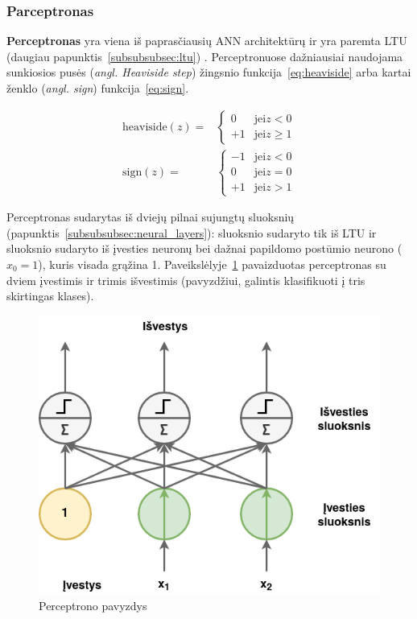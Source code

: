\documentclass{VUMIFPSbakalaurinis}
\begin{document}
\subsubsection{Parceptronas}
{
	\textbf{Perceptronas} yra viena iš paprasčiausių ANN architektūrų ir yra paremta LTU (daugiau papunktis~\ref{subsubsubsec:ltu}) \cite{rosenblatt1957perceptron}. Perceptronuose dažniausiai naudojama sunkiosios pusės (\textit{angl. Heaviside step}) žingsnio funkcija~\ref{eq:heaviside} arba kartai ženklo (\textit{angl. sign}) funkcija~\ref{eq:sign}.
	
	\begin{align}
		\label{eq:heaviside}
		\textrm{heaviside} (z) = &
		\begin{cases} 
			0 & \textrm{jei} z < 0 \\ 
			+1 & \textrm{jei} z \geq 1 
		\end{cases} \\
		\label{eq:sign}
		\textrm{sign} (z) = &
		\begin{cases} 
			-1 & \textrm{jei} z < 0 \\ 
			0 & \textrm{jei} z = 0 \\ 
			+1 & \textrm{jei} z > 1 
		\end{cases}
	\end{align}
	
	Perceptronas sudarytas iš dviejų pilnai sujungtų sluoksnių (papunktis~\ref{subsubsubsec:neural_layers}): sluoksnio sudaryto tik iš LTU ir sluoksnio sudaryto iš įvesties neuronų bei dažnai papildomo postūmio neurono (\(x_0 = 1\)), kuris visada grąžina 1. Paveikslėlyje~\ref{img:perceptron} pavaizduotas perceptronas su dviem įvestimis ir trimis išvestimis (pavyzdžiui, galintis klasifikuoti į tris skirtingas klases).
	
	
	\begin{figure}[H]
		\centering
		\includegraphics[scale=0.5]{img/perceptron}
		\caption{Perceptrono pavyzdys}
		\label{img:perceptron}
	\end{figure} 
	
}
\end{document}
